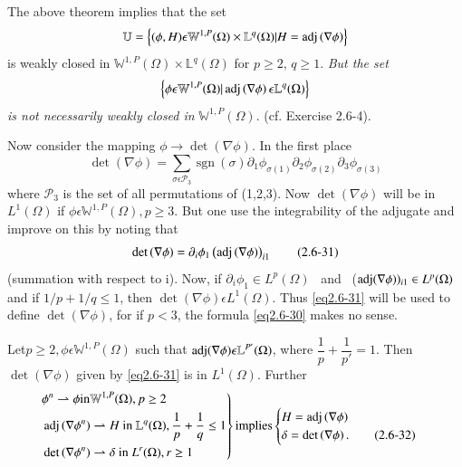 \begin{remark}\label{chap2-rem2.6.4}%
The above theorem implies that the set 
$$
\mathbb{U} = \left\{(\phi,H) \epsilon \mathbb{W}^{1,P}(\Omega) \times
\mathbb{L}^q (\Omega) | H = \operatorname{adj} \left(\nabla \phi\right)\right\} 
$$
is weakly closed in $\mathbb{W}^{1,P}(\Omega) \times \mathbb{L}^q
  (\Omega)$ for $p \ge 2$, $q \ge 1$. {\em But the set}  
  $$
  \left\{\phi \epsilon \mathbb{W}^{1,P}(\Omega)| \operatorname{adj} \left(\nabla
  \phi\right) \epsilon \mathbb{L}^q(\Omega)\right\} 
  $$
  {\em is not necessarily weakly closed in}
  $\mathbb{W}^{1,P}(\Omega)$. (cf. Exercise 2.6-4). 
\end{remark}

Now consider the mapping $\phi \to \det (\nabla \phi)$. In
the first place 
\begin{equation*}
  \det \left(\nabla \phi\right) = \sum_{\sigma \epsilon \mathcal{P}_3}
  ~\text{sgn}~ (\sigma)\partial_1 \phi_{\sigma(1)} \partial_2
  \phi_{\sigma(2)}\partial_3 \phi_{\sigma(3)} \tag{2.6-30} \label{eq2.6-30}
\end{equation*}
where $\mathcal{P}_3$ is the set of all permutations of (1,2,3). Now
$\det (\nabla \phi)$ will be in $L^1 (\Omega)$ if $\phi
\epsilon \mathbb{W}^{1,P}(\Omega), p \ge 3$. But one use the
integrability of the adjugate and improve on this by noting that  
\begin{equation*}
  \det \left(\nabla \phi\right)=\partial_i \phi_1\left(\operatorname{adj}
  \left(\nabla  \phi\right)\right)_{i1} \tag{2.6-31} \label{eq2.6-31}
\end{equation*}
(summation with respect to i). Now, if $\partial_i \phi_1 \in
L^p (\Omega)$~ and~ ($\adj (\nabla \phi))_{i1} \in\break L^p
(\Omega)$ and if $1/p + 1/q \le 1$, then $\det (\nabla \phi)
\epsilon L^1(\Omega)$.  
Thus \eqref{eq2.6-31} will be used to define $\det (\nabla \phi)$,
for if $p < 3$, the formula \eqref{eq2.6-30} makes no sense. 

\begin{theorem}\label{chap2-thm2.6.3}%
Let\pageoriginale $p \ge 2, \phi \epsilon \mathbb{W}^{1,P}(\Omega)$ such that
$\operatorname{adj} (\nabla \phi) \epsilon \mathbb{L}^{P'}(\Omega)$,
where $\dfrac{1}{p}+\dfrac{1}{p'}=1$. Then $\det (\nabla
\phi)$ given by \eqref{eq2.6-31} is in $L^1(\Omega)$. Further 
\begin{multline*}
  \left.
  \begin{aligned}
    & \phi^n \rightharpoonup \phi \text{in} \mathbb{W}^{1,P}(\Omega), p \ge 2 \\
    & \operatorname{adj} \left(\nabla \phi^n\right) \rightharpoonup H ~\text{in}~
    \mathbb{L}^q(\Omega), \frac{1}{p}+\frac{1}{q} \le 1 \\ 
    & \det \left(\nabla \phi^n\right) \rightharpoonup \delta
    ~\text{in}~  L^r(\Omega),r \ge 1  
  \end{aligned} \right\} 
  \text{implies}
  \begin{cases}
    H= \operatorname{adj} \left(\nabla \phi \right)\\
    \delta =\det \left(\nabla \phi\right). \tag{2.6-32}\label{eq2.6-32}
  \end{cases}
\end{multline*}
\end{theorem}

